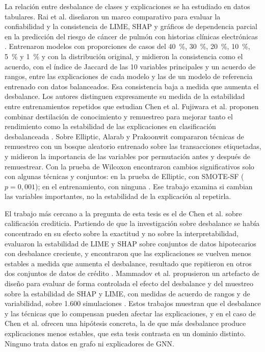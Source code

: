 La relación entre desbalance de clases y explicaciones se ha estudiado en datos tabulares. Rai
et al. diseñaron un marco comparativo para evaluar la confiabilidad y la consistencia de LIME,
SHAP y gráficos de dependencia parcial en la predicción del riesgo de cáncer de pulmón con
historias clínicas electrónicas \cite{Rai2025Evaluating}. Entrenaron modelos con proporciones de
casos del 40~\%, 30~\%, 20~\%, 10~\%, 5~\% y 1~\% y con la distribución original, y midieron la
consistencia como el acuerdo, con el índice de Jaccard de las 10 variables principales y un
acuerdo de rangos, entre las explicaciones de cada modelo y las de un modelo de referencia
entrenado con datos balanceados. Esa consistencia baja a medida que aumenta el desbalance. Los
autores distinguen expresamente su medida de la estabilidad entre entrenamientos repetidos que
estudian Chen et al.
Fujiwara et al. proponen combinar destilación de conocimiento y remuestreo para mejorar tanto
el rendimiento como la estabilidad de las explicaciones en clasificación desbalanceada
\cite{Fujiwara2024Stability}. Sobre Elliptic, Alarab y Prakoonwit compararon técnicas de
remuestreo con un bosque aleatorio entrenado sobre las transacciones etiquetadas, y midieron la
importancia de las variables por permutación antes y después de remuestrear. Con la prueba de
Wilcoxon encontraron cambios significativos solo con algunas técnicas y conjuntos: en la prueba
de Elliptic, con SMOTE-SF ($p = 0{,}001$); en el entrenamiento, con ninguna
\cite{Alarab2022Resampling}. Ese trabajo examina si cambian las variables importantes, no la
estabilidad de la explicación al repetirla.

El trabajo más cercano a la pregunta de esta tesis es el de Chen et al. sobre calificación
crediticia. Partiendo de que la investigación sobre desbalance se había concentrado en su
efecto sobre la exactitud y no sobre la interpretabilidad, evaluaron la estabilidad de LIME y
SHAP sobre conjuntos de datos hipotecarios con desbalance creciente, y encontraron que las
explicaciones se vuelven menos estables a medida que aumenta el desbalance, resultado que
repitieron en otros dos conjuntos de datos de crédito \cite{Chen2023CreditImbalance}. Mammadov
et al. propusieron un artefacto de diseño para evaluar de forma controlada el efecto del
desbalance y del muestreo sobre la estabilidad de SHAP y LIME, con medidas de acuerdo de rangos
y de variabilidad, sobre 1.600 simulaciones \cite{TEM2026Stability}. Estos trabajos muestran que
el desbalance y las técnicas que lo compensan pueden afectar las explicaciones, y en el caso de
Chen et al. ofrecen una hipótesis concreta, la de que más desbalance produce explicaciones
menos estables, que esta tesis contrasta en un dominio distinto. Ninguno trata datos en grafo
ni explicadores de GNN.

